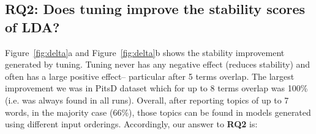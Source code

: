 \documentclass[10pt,conference]{IEEEtran}
\theoremstyle{break}
\begin{document}
\subsection{\textbf{RQ2: Does tuning improve the stability scores of LDA?}}

 Figure~\ref{fig:delta}a and Figure~\ref{fig:delta}b shows the stability improvement
 generated by tuning.
   Tuning never
  has any negative effect (reduces stability) and often has a large positive effect--
  particular  after 5 terms overlap.
   The largest improvement  we
   was  in PitsD dataset which for up to 8 terms overlap was 100\% (i.e. was always
   found in all runs).
   Overall, after reporting topics of up to 7 words, in the majority case (66\%),
  those topics can be found in models generated using different input orderings.
  Accordingly, our answer to {\bf RQ2} is:
\end{document}
